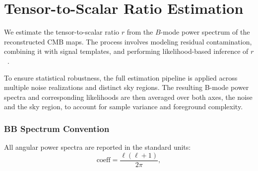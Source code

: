 \documentclass[fleqn,usenatbib]{mnras}
\begin{document}
\section{Tensor-to-Scalar Ratio Estimation}
\label{sec:r_estimation}

We estimate the tensor-to-scalar ratio \( r \) from the \( B \)-mode power spectrum of the reconstructed CMB maps. The process involves modeling residual contamination, combining it with signal templates, and performing likelihood-based inference of \( r \)~\citep{STOMPER16, ERRAR18}.

To ensure statistical robustness, the full estimation pipeline is applied across multiple noise realizations and distinct sky regions. The resulting B-mode power spectra and corresponding likelihoods are then averaged over both axes, the noise and the sky region, to account for sample variance and foreground complexity.

\subsubsection*{BB Spectrum Convention}
All angular power spectra are reported in the standard units:
\[
\text{coeff} = \frac{\ell(\ell + 1)}{2\pi},
\]
\end{document}
